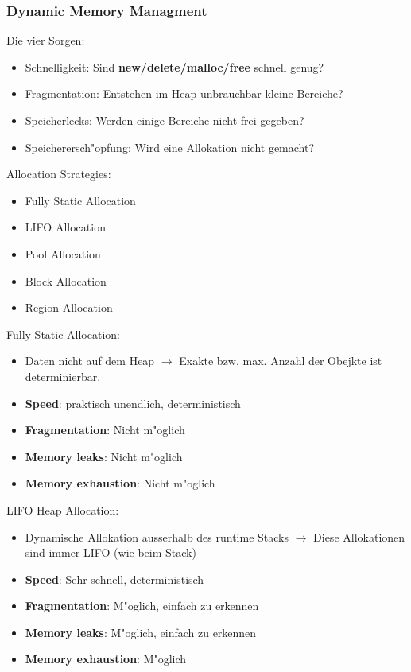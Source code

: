 \subsubsection{Dynamic Memory Managment}
Die vier Sorgen:
\begin{itemize}
\item Schnelligkeit: Sind \textbf{new/delete/malloc/free} schnell genug?
\item Fragmentation: Entstehen im Heap unbrauchbar kleine Bereiche?
\item Speicherlecks: Werden einige Bereiche nicht frei gegeben?
\item Speicherersch"opfung: Wird eine Allokation nicht gemacht?
\end{itemize}

Allocation Strategies: 
\begin{itemize}
\item Fully Static Allocation
\item LIFO Allocation
\item Pool Allocation
\item Block Allocation
\item Region Allocation
\end{itemize}

Fully Static Allocation: 
\begin{itemize}
\item Daten nicht auf dem Heap $\rightarrow$ Exakte bzw. max. Anzahl der Obejkte ist determinierbar. 
\item \textbf{Speed}: praktisch unendlich, deterministisch
\item \textbf{Fragmentation}: Nicht m"oglich
\item \textbf{Memory leaks}: Nicht m"oglich
\item \textbf{Memory exhaustion}: Nicht m"oglich
\end{itemize}

LIFO Heap Allocation: 
\begin{itemize}
\item Dynamische Allokation ausserhalb des runtime Stacks $\rightarrow$ Diese Allokationen sind immer LIFO (wie beim Stack)
\item \textbf{Speed}: Sehr schnell, deterministisch 
\item \textbf{Fragmentation}: M"oglich, einfach zu erkennen
\item \textbf{Memory leaks}: M"oglich, einfach zu erkennen
\item \textbf{Memory exhaustion}: M"oglich
\end{itemize}


